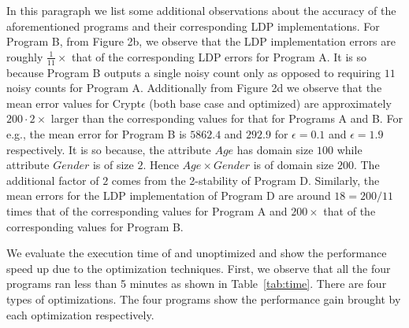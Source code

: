 {In this paragraph we list some additional observations about the accuracy of the aforementioned \system programs and their corresponding \textsf{LDP} implementations.  For Program B, from Figure 2b, we observe that the \textsf{LDP} implementation errors  are roughly $\frac{1}{11}\times$ that of the corresponding \textsf{LDP} errors for Program A. It is so because Program B outputs a single noisy count only as opposed to requiring $11$ noisy counts for Program A. Additionally from Figure 2d we observe that the mean error values for Crypt$\epsilon$ (both base case and optimized) are approximately $200\cdot 2 \times $ larger than the corresponding values for that for Programs A and B. For e.g., the mean error for Program B is $5862.4$ and $292.9$ for $\epsilon=0.1$ and $\epsilon=1.9$ respectively. It is so because, the attribute $Age$ has domain size $100$ while attribute $Gender$ is of size $2$. Hence $Age\times Gender$ is of domain size $200$. The additional factor of $2$ comes from the 2-stability of Program D. Similarly, the mean errors for the \textsf{LDP} implementation of Program D are around $18 = 200/11$ times that of the corresponding values for Program A and $200\times$ that of the corresponding values for Program B.
}

 We evaluate the execution time of \system and unoptimized \system and show the performance speed up due to the optimization techniques. First, we observe that all the four programs ran less than 5 minutes as shown in Table~\ref{tab:time}.  There are four types of optimizations. The four programs show the performance gain brought by each optimization respectively.



